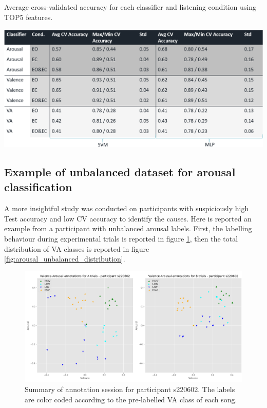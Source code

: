 \begin{table}[h!]
  \caption{Average cross-validated accuracy for each classifier and listening condition using TOP5 features.}
  \label{tbl:top5_cv_experiment}
  \includegraphics[width=\linewidth]{img/appendix/top5_cv_experiment.png}
\end{table}

\FloatBarrier
\subsection{Example of unbalanced dataset for arousal classification}
\label{sec:appendix_A3.3}
A more insightful study was conducted on participants with suspiciously high Test accuracy and low CV accuracy to identify the causes. Here is reported an example from a participant with unbalanced arousal labels. First, the labelling behaviour during experimental trials is reported in figure \ref{fig:arousal_unbalanced}, then the total distribution of \ac{VA} classes is reported in figure \ref{fig:arousal_unbalanced_distribution}.

\begin{figure}[!htb]
\includegraphics[width=16cm]{img/appendix/arousal_unbalanced.png}
\centering
\caption{Summary of annotation session for participant s220602. The labels are color coded according to the pre-labelled 
VA class of each song.}\label{fig:arousal_unbalanced}
\end{figure}


